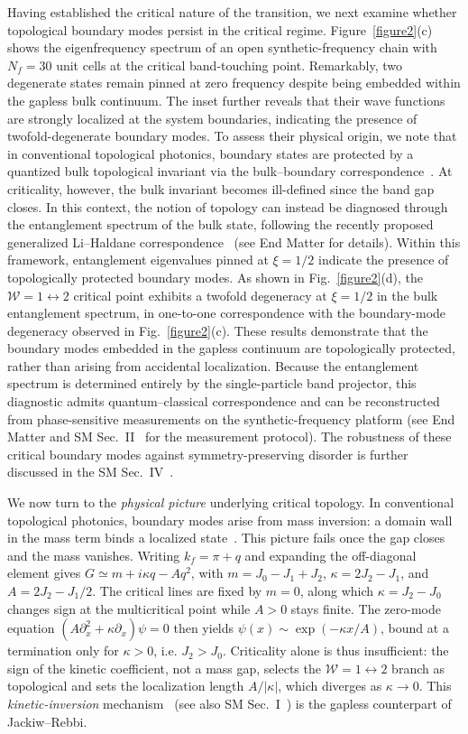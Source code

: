 \documentclass[aps,prl,twocolumn,preprintnumbers,amsmath,amssymb,superscriptaddress,10pt]{revtex4-2}
\begin{document}
Having established the critical nature of the transition, we next examine whether topological boundary modes persist in the critical regime. Figure~\ref{figure2}(c) shows the eigenfrequency spectrum of an open synthetic-frequency chain with $N_f=30$ unit cells at the critical band-touching point. Remarkably, two degenerate states remain pinned at zero frequency despite being embedded within the gapless bulk continuum. The inset further reveals that their wave functions are strongly localized at the system boundaries, indicating the presence of twofold-degenerate boundary modes. To assess their physical origin, we note that in conventional topological photonics, boundary states are protected by a quantized bulk topological invariant via the bulk–boundary correspondence~\cite{Ozawa2019,HasanKane2010}. At criticality, however, the bulk invariant becomes ill-defined since the band gap closes. In this context, the notion of topology can instead be diagnosed through the entanglement spectrum of the bulk state, following the recently proposed generalized Li–Haldane correspondence~\cite{guo2025generalized} (see End Matter for details). Within this framework, entanglement eigenvalues pinned at $\xi=1/2$ indicate the presence of topologically protected boundary modes. As shown in Fig.~\ref{figure2}(d), the $\mathcal{W}=1\leftrightarrow2$ critical point exhibits a twofold degeneracy at $\xi=1/2$ in the bulk entanglement spectrum, in one-to-one correspondence with the boundary-mode degeneracy observed in Fig.~\ref{figure2}(c). These results demonstrate that the boundary modes embedded in the gapless continuum are topologically protected, rather than arising from accidental localization. Because the entanglement spectrum is determined entirely by the single-particle band projector, this diagnostic admits quantum–classical correspondence and can be reconstructed from phase-sensitive measurements on the synthetic-frequency platform (see End Matter and SM Sec.~II~\cite{SM} for the measurement protocol). The robustness of these critical boundary modes against symmetry-preserving disorder is further discussed in the SM Sec.~IV~\cite{SM}.


We now turn to the \textit{physical picture} underlying critical topology. In
conventional topological photonics, boundary modes arise from mass inversion: a
domain wall in the mass term binds a localized state~\cite{PhysRevD.13.3398}.
This picture fails once the gap closes and the mass vanishes. Writing
$k_f=\pi+q$ and expanding the off-diagonal element gives
$G\simeq m+i\kappa q-Aq^{2}$, with $m=J_0-J_1+J_2$, $\kappa=2J_2-J_1$, and
$A=2J_2-J_1/2$. The critical lines are fixed by $m=0$, along which
$\kappa=J_2-J_0$ changes sign at the multicritical point while $A>0$ stays
finite. The zero-mode equation $(A\partial_x^{2}+\kappa\partial_x)\psi=0$ then
yields $\psi(x)\sim \exp(-\kappa x/A)$, bound at a termination only for
$\kappa>0$, i.e. $J_2>J_0$. Criticality alone is thus insufficient: the sign of
the kinetic coefficient, not a mass gap, selects the
$\mathcal{W}=1\leftrightarrow2$ branch as topological and sets the localization
length $A/|\kappa|$, which diverges as $\kappa \to 0$.
This \emph{kinetic-inversion} mechanism~\cite{verresen2020} (see also SM
Sec.~I~\cite{SM}) is the gapless counterpart of Jackiw--Rebbi.
\end{document}
